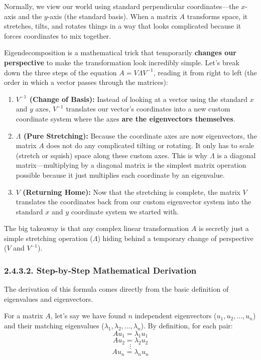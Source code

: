 \documentclass{article}
\begin{document}
Normally, we view our world using standard perpendicular coordinates—the $x$-axis and the $y$-axis (the standard basis). When a matrix $A$ transforms space, it stretches, tilts, and rotates things in a way that looks complicated because it forces coordinates to mix together. 

Eigendecomposition is a mathematical trick that temporarily \textbf{changes our perspective} to make the transformation look incredibly simple. Let's break down the three steps of the equation $A = V \Lambda V^{-1}$, reading it from right to left (the order in which a vector passes through the matrices):

\begin{enumerate}
    \item \textbf{$V^{-1}$ (Change of Basis):} Instead of looking at a vector using the standard $x$ and $y$ axes, $V^{-1}$ translates our vector's coordinates into a new custom coordinate system where the axes \textbf{are the eigenvectors themselves}.
    \item \textbf{$\Lambda$ (Pure Stretching):} Because the coordinate axes are now eigenvectors, the matrix $A$ does not do any complicated tilting or rotating. It only has to scale (stretch or squish) space along these custom axes. This is why $\Lambda$ is a diagonal matrix—multiplying by a diagonal matrix is the simplest matrix operation possible because it just multiplies each coordinate by an eigenvalue.
    \item \textbf{$V$ (Returning Home):} Now that the stretching is complete, the matrix $V$ translates the coordinates back from our custom eigenvector system into the standard $x$ and $y$ coordinate system we started with.
\end{enumerate}

The big takeaway is that any complex linear transformation $A$ is secretly just a simple stretching operation ($\Lambda$) hiding behind a temporary change of perspective ($V$ and $V^{-1}$).

\subsubsection*{2.4.3.2. Step-by-Step Mathematical Derivation}

The derivation of this formula comes directly from the basic definition of eigenvalues and eigenvectors.

For a matrix $A$, let’s say we have found $n$ independent eigenvectors ($u_1, u_2, \dots, u_n$) and their matching eigenvalues ($\lambda_1, \lambda_2, \dots, \lambda_n$). By definition, for each pair:
\[ A u_1 = \lambda_1 u_1 \]
\[ A u_2 = \lambda_2 u_2 \]
\[ \vdots \]
\[ A u_n = \lambda_n u_n \]
\end{document}
